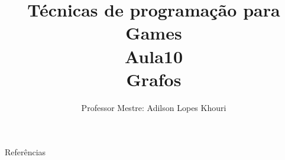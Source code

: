 \documentclass[compress, hyperref={pdfpagelayout=SinglePage}]{beamer}
\title[AED - Aula 09]{Técnicas de programação para Games \\ Aula10 \\ Grafos}
\author{Professor Mestre: Adilson Lopes Khouri}
\begin{document}
	\begin{frame}
		\titlepage
	\end{frame}
	
	
	
	
	
	
	
	

	

	\begin{frame}[allowframebreaks]{Referências}
			\tiny
			\nocite{*}
			
	    		
	\end{frame}
\end{document}
